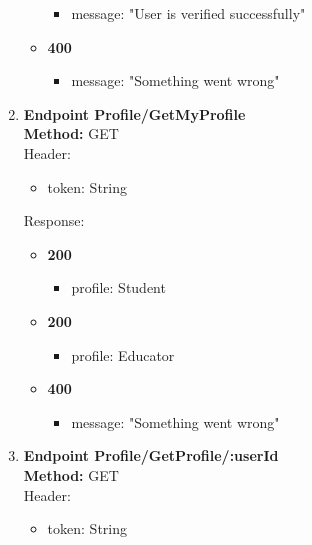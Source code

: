 \begin{enumerate}
\begin{itemize}
        \begin{itemize}
            \item message: "User is verified successfully"
        \end{itemize}
                \item \textbf{400} \\
        \begin{itemize}
            \item message: "Something went wrong"
        \end{itemize}
    \end{itemize}
    \item \textbf{Endpoint Profile/GetMyProfile} \\
    \textbf{Method:} GET \\
    Header:\\
    \begin{itemize}
        \item token: String
    \end{itemize}
    Response:\\
    \begin{itemize}
        \item \textbf{200} \\
        \begin{itemize}
            \item profile: Student
        \end{itemize}
        \item \textbf{200} \\
        \begin{itemize}
            \item profile: Educator
        \end{itemize}
        \item \textbf{400} \\
        \begin{itemize}
            \item message: "Something went wrong"
        \end{itemize}
    \end{itemize}
    \item \textbf{Endpoint Profile/GetProfile/:userId} \\
    \textbf{Method:} GET \\
    Header:\\
    \begin{itemize}
        \item token: String
    \end{itemize}

\end{enumerate}
